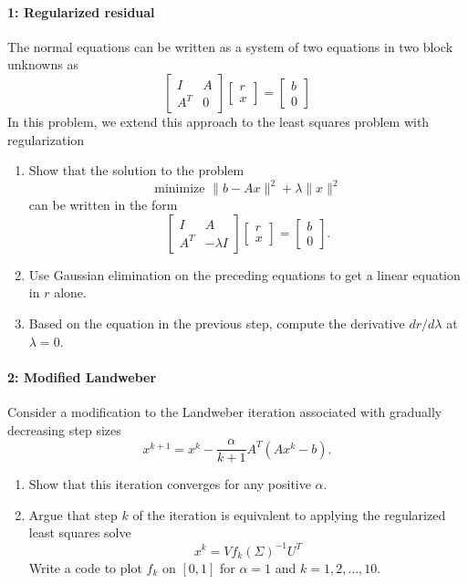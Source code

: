 \documentclass[12pt, leqno]{article} %
\begin{document}


\paragraph*{1: Regularized residual}
The normal equations can be written as a system of two equations
in two block unknowns as
\[
  \begin{bmatrix} I & A \\ A^T & 0 \end{bmatrix}
  \begin{bmatrix} r \\ x \end{bmatrix} =
  \begin{bmatrix} b \\ 0 \end{bmatrix}
\]
In this problem, we extend this approach to the least squares problem
with regularization
\begin{enumerate}
\item
  Show that the solution to the problem
  \[
    \mbox{minimize } \|b-Ax\|^2 + \lambda \|x\|^2
  \]
  can be written in the form
  \[
    \begin{bmatrix} I & A \\ A^T & -\lambda I \end{bmatrix}
    \begin{bmatrix} r \\ x \end{bmatrix} =
    \begin{bmatrix} b \\ 0 \end{bmatrix}.
  \]
\item
  Use Gaussian elimination on the preceding equations to get a linear
  equation in $r$ alone.
\item
  Based on the equation in the previous step, compute the
  derivative $dr/d\lambda$ at $\lambda = 0$.
\end{enumerate}


\paragraph*{2: Modified Landweber}
Consider a modification to the Landweber iteration associated with
gradually decreasing step sizes
\[
  x^{k+1} = x^k - \frac{\alpha}{k+1} A^T (Ax^k-b).
\]
\begin{enumerate}
\item
  Show that this iteration converges for any
  positive $\alpha$.
\item
  Argue that step $k$ of the iteration is equivalent to
  applying the regularized least squares solve
  \[
    x^{k} = V f_k(\Sigma)^{-1} U^T
  \]
  Write a code to plot $f_k$ on $[0,1]$ for $\alpha = 1$
  and $k = 1, 2, \ldots, 10$.
\end{enumerate}
\end{document}
